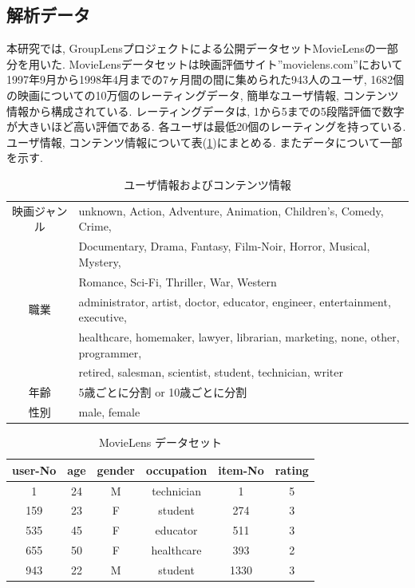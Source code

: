 \documentclass[a4paper,11pt]{jarticle}
\begin{document}
\subsection{解析データ}

本研究では, GroupLensプロジェクトによる公開データセットMovieLensの一部分を用いた. MovieLensデータセットは映画評価サイト''movielens.com''において1997年9月から1998年4月までの7ヶ月間の間に集められた943人のユーザ, 1682個の映画についての10万個のレーティングデータ, 簡単なユーザ情報, コンテンツ情報から構成されている. レーティングデータは, 1から5までの5段階評価で数字が大きいほど高い評価である. 各ユーザは最低20個のレーティングを持っている. ユーザ情報, コンテンツ情報について表(\ref{MovieLens})にまとめる. またデータについて一部を示す.

\begin{table}[H]
\begin{center}
\caption{ユーザ情報およびコンテンツ情報}   %
\label{MovieLens}   %
\begin{tabular}{c l}
\hline
映画ジャンル & unknown, Action, Adventure, Animation, Children's, Comedy, Crime, \\
                 & Documentary, Drama, Fantasy, Film-Noir, Horror, Musical, Mystery, \\
                 & Romance, Sci-Fi, Thriller, War, Western \\
職業          & administrator, artist, doctor, educator, engineer, entertainment, executive, \\
                & healthcare, homemaker, lawyer, librarian, marketing, none, other, programmer, \\
                & retired, salesman, scientist, student, technician, writer \\
年齢 & 5歳ごとに分割 or 10歳ごとに分割 \\
性別 & male, female\\ 
\hline
\end{tabular}
\end{center}
\end{table}

\begin{table}[H]
\begin{center}
\caption{MovieLens データセット}   %
\begin{tabular}{|c|c|c|c|c|c|}
\hline
user-No	&	age	&	gender	&	occupation	&	item-No	& rating \\ \hline \hline
1	&	24	&	M	&	technician	&  1  & 5 \\	\hline
159	&    23	&     F	&      student	      &  274 & 3 \\	\hline
535	&	45	&	F	&	educator	&	511	& 3 \\ \hline
655	&	50	&	F	&	healthcare	& 393 & 2 \\	\hline
943	&	22	&	M	&	student	&	1330 & 3 \\  \hline
\end{tabular}
\end{center}
\end{table}
\end{document}
